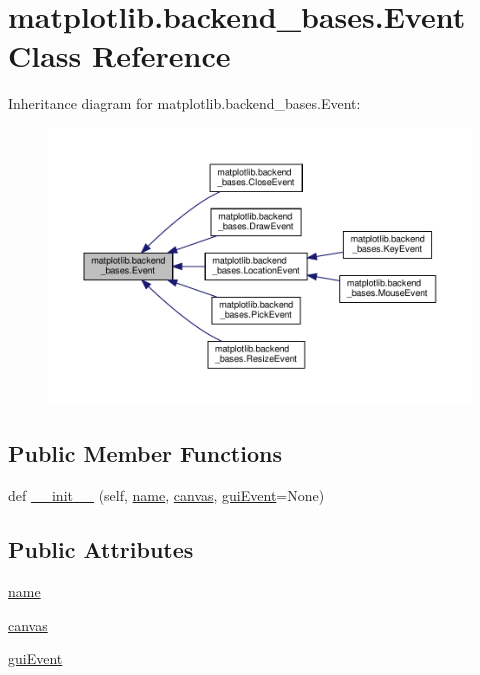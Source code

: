 \hypertarget{classmatplotlib_1_1backend__bases_1_1Event}{}\section{matplotlib.\+backend\+\_\+bases.\+Event Class Reference}
\label{classmatplotlib_1_1backend__bases_1_1Event}


Inheritance diagram for matplotlib.\+backend\+\_\+bases.\+Event\+:
\nopagebreak
\begin{figure}[H]
\begin{center}
\leavevmode
\includegraphics[width=350pt]{classmatplotlib_1_1backend__bases_1_1Event__inherit__graph}
\end{center}
\end{figure}
\subsection*{Public Member Functions}
\begin{DoxyCompactItemize}
\item 
def \hyperlink{classmatplotlib_1_1backend__bases_1_1Event_a39ec5c338f3c96435d8cc2aacd3d4be4}{\+\_\+\+\_\+init\+\_\+\+\_\+} (self, \hyperlink{classmatplotlib_1_1backend__bases_1_1Event_a4b10ea7af7c8a0b20bcdbb9ca03e1654}{name}, \hyperlink{classmatplotlib_1_1backend__bases_1_1Event_a7721d867d81a1255b1aeb51babec4e14}{canvas}, \hyperlink{classmatplotlib_1_1backend__bases_1_1Event_a6cc1dc3c9479b3e5f227f329037adb98}{gui\+Event}=None)
\end{DoxyCompactItemize}
\subsection*{Public Attributes}
\begin{DoxyCompactItemize}
\item 
\hyperlink{classmatplotlib_1_1backend__bases_1_1Event_a4b10ea7af7c8a0b20bcdbb9ca03e1654}{name}
\item 
\hyperlink{classmatplotlib_1_1backend__bases_1_1Event_a7721d867d81a1255b1aeb51babec4e14}{canvas}
\item 
\hyperlink{classmatplotlib_1_1backend__bases_1_1Event_a6cc1dc3c9479b3e5f227f329037adb98}{gui\+Event}
\end{DoxyCompactItemize}


